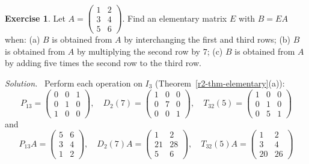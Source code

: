 \documentclass[12pt]{article}
\theoremstyle{definition}
\newtheorem{exercise}{Exercise}
\newenvironment{solution}{\par\noindent\textit{Solution.}\ }{\par\smallskip}
\begin{document}
\begin{exercise}\label{r2-ex-elementary}
Let \(A=\begin{pmatrix}1&2\\3&4\\5&6\end{pmatrix}\). Find an elementary matrix \(E\) with
\(B=EA\) when:
(a) \(B\) is obtained from \(A\) by interchanging the first and third rows;
(b) \(B\) is obtained from \(A\) by multiplying the second row by \(7\);
(c) \(B\) is obtained from \(A\) by adding five times the second row to the third row.
\end{exercise}
\begin{solution}
Perform each operation on \(I_3\) (Theorem~\ref{r2-thm-elementary}(a)):
\[
P_{13}=\begin{pmatrix}0&0&1\\0&1&0\\1&0&0\end{pmatrix},\quad
D_2(7)=\begin{pmatrix}1&0&0\\0&7&0\\0&0&1\end{pmatrix},\quad
T_{32}(5)=\begin{pmatrix}1&0&0\\0&1&0\\0&5&1\end{pmatrix}
\]
and
\[
P_{13}A=\begin{pmatrix}5&6\\3&4\\1&2\end{pmatrix},\quad
D_2(7)A=\begin{pmatrix}1&2\\21&28\\5&6\end{pmatrix},\quad
T_{32}(5)A=\begin{pmatrix}1&2\\3&4\\20&26\end{pmatrix}
\]
\end{solution}
\end{document}
